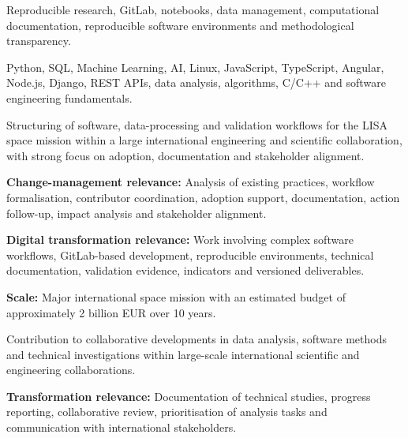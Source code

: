 \documentclass[8pt,a4paper,ragged2e,withhyper]{altacv}
\begin{document}
\small{Reproducible research, GitLab, notebooks, data management, computational documentation, reproducible software environments and methodological transparency.}

\divider


\divider


\small{Python, SQL, Machine Learning, AI, Linux, JavaScript, TypeScript, Angular, Node.js, Django, REST APIs, data analysis, algorithms, C/C++ and software engineering fundamentals.}



Structuring of software, data-processing and validation workflows for the LISA space mission within a large international engineering and scientific collaboration, with strong focus on adoption, documentation and stakeholder alignment.

\textbf{Change-management relevance:} Analysis of existing practices, workflow formalisation, contributor coordination, adoption support, documentation, action follow-up, impact analysis and stakeholder alignment.

\textbf{Digital transformation relevance:} Work involving complex software workflows, GitLab-based development, reproducible environments, technical documentation, validation evidence, indicators and versioned deliverables.

\textbf{Scale:} Major international space mission with an estimated budget of approximately 2 billion EUR over 10 years.

\divider


Contribution to collaborative developments in data analysis, software methods and technical investigations within large-scale international scientific and engineering collaborations.

\textbf{Transformation relevance:} Documentation of technical studies, progress reporting, collaborative review, prioritisation of analysis tasks and communication with international stakeholders.
\end{document}
